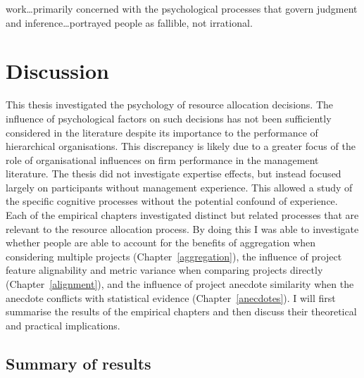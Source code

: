 \documentclass[a4paper, nobind, dvipsnames]{templates/ociamthesis}
\theoremstyle{definition}
\theoremstyle{definition}
\theoremstyle{definition}
\theoremstyle{definition}
\theoremstyle{remark}
\begin{document}
\begin{savequote}
work\ldots primarily concerned with the psychological processes that
govern judgment and inference\ldots portrayed people as fallible, not
irrational.
\end{savequote}

\hypertarget{discussion}{%
\chapter{Discussion}\label{discussion}}

\minitoc

This thesis investigated the psychology of resource allocation decisions. The
influence of psychological factors on such decisions has not been sufficiently
considered in the literature despite its importance to the performance of
hierarchical organisations. This discrepancy is likely due to a greater focus of
the role of organisational influences on firm performance in the management
literature. The thesis did not investigate expertise effects, but instead
focused largely on participants without management experience. This allowed a
study of the specific cognitive processes without the potential confound of
experience. Each of the empirical chapters investigated distinct but related
processes that are relevant to the resource allocation process. By doing this I
was able to investigate whether people are able to account for the benefits of
aggregation when considering multiple projects (Chapter~\ref{aggregation}), the
influence of project feature alignability and metric variance when comparing
projects directly (Chapter~\ref{alignment}), and the influence of project
anecdote similarity when the anecdote conflicts with statistical evidence
(Chapter~\ref{anecdotes}). I will first summarise the results of the empirical
chapters and then discuss their theoretical and practical implications.

\section{Summary of results}
\end{document}
